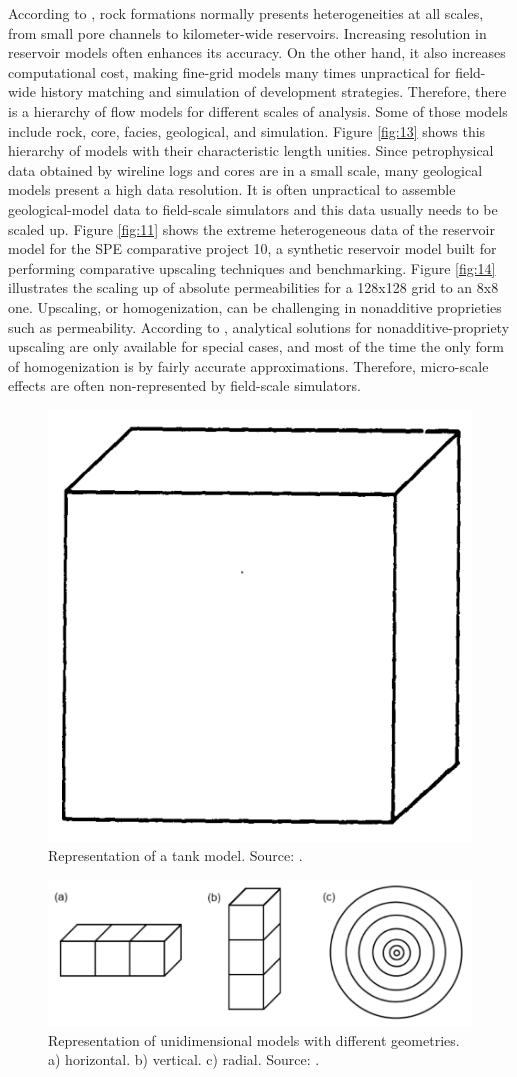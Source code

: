 According to \cite{Lie2015}, rock formations normally presents heterogeneities at all scales, from small pore channels to kilometer-wide reservoirs. Increasing resolution in reservoir models often enhances its accuracy. On the other hand, it also increases computational cost, making fine-grid models many times unpractical for field-wide history matching and simulation of development strategies. Therefore, there is a hierarchy of flow models for different scales of analysis. Some of those models include rock, core, facies, geological, and simulation. Figure \ref{fig:13} shows this hierarchy of models with their characteristic length unities. Since petrophysical data obtained by wireline logs and cores are in a small scale, many geological models present a high data resolution. It is often unpractical to assemble geological-model data to field-scale simulators and this data usually needs to be scaled up. Figure \ref{fig:11} shows the extreme heterogeneous data of the reservoir model for the SPE comparative project 10, a synthetic reservoir model built for performing comparative upscaling techniques and benchmarking. Figure \ref{fig:14} illustrates the scaling up of absolute permeabilities for a 128x128 grid to an 8x8 one. Upscaling, or homogenization, can be challenging in nonadditive proprieties such as permeability. According to \cite{Lie2015}, analytical solutions for nonadditive-propriety upscaling are only available for special cases, and most of the time the only form of homogenization is by fairly accurate approximations. Therefore, micro-scale effects are often non-represented by field-scale simulators.
\begin{figure}
	\centering
	\includegraphics[width=0.2\linewidth]{Images/8}
	\caption{Representation of a tank model. Source: \cite{Odeh1969}.}
	\label{fig:8}
\end{figure}
\begin{figure}
	\centering
	\includegraphics[width=0.6\linewidth]{Images/7}
	\caption{Representation of unidimensional models with different geometries. a) horizontal. b) vertical. c) radial. Source: \cite{Mattax1990}.}
	\label{fig:7}
\end{figure}
